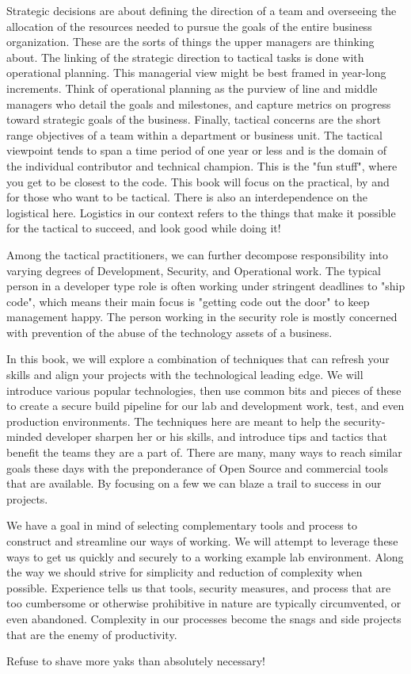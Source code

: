 \justify
Strategic decisions are about defining the direction of a team and overseeing
the allocation of the resources needed to pursue the goals of the entire
business organization. These are the sorts of things the upper managers are
thinking about. The linking of the strategic direction to tactical tasks is
done with operational planning. This managerial view might be best framed in
year-long increments. Think of operational planning as the purview of line
and middle managers who detail the goals and milestones, and capture metrics
on progress toward strategic goals of the business. Finally, tactical concerns
are the short range objectives of a team within a department or business unit.
The tactical viewpoint tends to span a time period of one year or less and is
the domain of the individual contributor and technical champion. This is the
"fun stuff", where you get to be closest to the code. This book will focus
on the practical, by and for those who want to be tactical. There is also
an interdependence on the logistical here. Logistics in our context refers to
the things that make it possible for the tactical to succeed, and look good
while doing it!

\justify
Among the tactical practitioners, we can further decompose responsibility into
varying degrees of Development, Security, and Operational work. The typical
person in a developer type role
is often working under stringent deadlines to "ship code", which means their
main focus is "getting code out the door" to keep management happy. The person
working in the security role is mostly concerned with prevention of the abuse
of the technology assets of a business.

\justify
In this book, we will explore a combination of techniques that can refresh your
skills and align your projects with the technological leading edge. We will
introduce various popular technologies, then use common bits and pieces of
these to create a secure build pipeline for our lab and development work,
test, and even production environments. The techniques here are meant to help
the security-minded developer sharpen her or his skills, and introduce tips
and tactics that benefit the teams they are a part of. There are many, many
ways to reach similar goals these days with the preponderance of Open Source
and commercial tools that are available. By focusing on a few we can blaze a
trail to success in our projects.

\justify
We have a goal in mind of selecting complementary tools and process to construct
and streamline our ways of working. We will attempt to leverage these ways to
get us quickly and securely to a working example lab environment. Along the
way we should strive for simplicity and reduction of complexity when possible.
Experience tells us that tools, security measures, and process that are too cumbersome
or otherwise prohibitive in nature are typically circumvented, or even abandoned.
Complexity in our processes become the snags and side projects that are the
enemy of productivity.

\justify
Refuse to shave more yaks than absolutely necessary!
